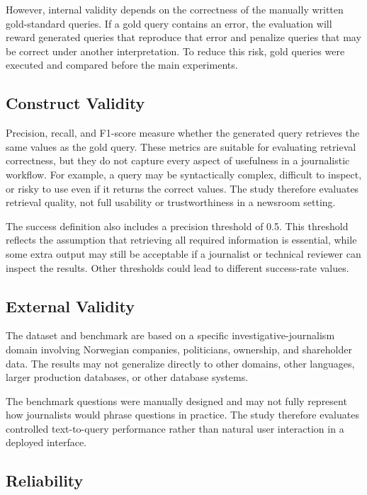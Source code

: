 However, internal validity depends on the correctness of the manually written gold-standard queries. If a gold query contains an error, the evaluation will reward generated queries that reproduce that error and penalize queries that may be correct under another interpretation. To reduce this risk, gold queries were executed and compared before the main experiments.

\subsection{Construct Validity}

Precision, recall, and F1-score measure whether the generated query retrieves the same values as the gold query. These metrics are suitable for evaluating retrieval correctness, but they do not capture every aspect of usefulness in a journalistic workflow. For example, a query may be syntactically complex, difficult to inspect, or risky to use even if it returns the correct values. The study therefore evaluates retrieval quality, not full usability or trustworthiness in a newsroom setting.

The success definition also includes a precision threshold of 0.5. This threshold reflects the assumption that retrieving all required information is essential, while some extra output may still be acceptable if a journalist or technical reviewer can inspect the results. Other thresholds could lead to different success-rate values.

\subsection{External Validity}

The dataset and benchmark are based on a specific investigative-journalism domain involving Norwegian companies, politicians, ownership, and shareholder data. The results may not generalize directly to other domains, other languages, larger production databases, or other database systems.

The benchmark questions were manually designed and may not fully represent how journalists would phrase questions in practice. The study therefore evaluates controlled text-to-query performance rather than natural user interaction in a deployed interface.

\subsection{Reliability}

